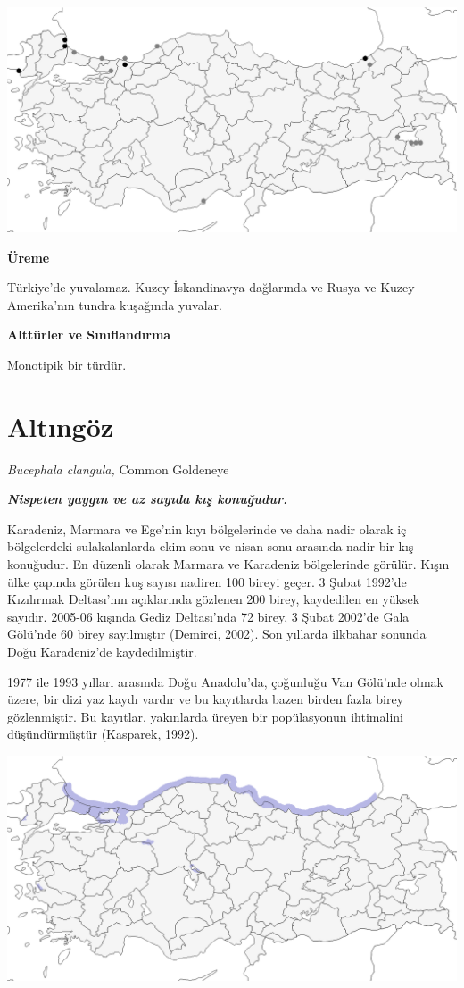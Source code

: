 \documentclass[
  a4paper,
  DIV=11,
  numbers=noendperiod]{scrartcl}
\begin{document}
\includegraphics{images/harita_Clangula hyemalis.png}

\textbf{Üreme}

Türkiye'de yuvalamaz. Kuzey İskandinavya dağlarında ve Rusya ve Kuzey
Amerika'nın tundra kuşağında yuvalar.

\textbf{Alttürler ve Sınıflandırma}

Monotipik bir türdür.

\section{Altıngöz}\label{altux131nguxf6z}

\emph{Bucephala clangula,} Common Goldeneye

\textbf{\emph{Nispeten yaygın ve az sayıda kış konuğudur.}}

Karadeniz, Marmara ve Ege'nin kıyı bölgelerinde ve daha nadir olarak iç
bölgelerdeki sulakalanlarda ekim sonu ve nisan sonu arasında nadir bir
kış konuğudur. En düzenli olarak Marmara ve Karadeniz bölgelerinde
görülür. Kışın ülke çapında görülen kuş sayısı nadiren 100 bireyi geçer.
3 Şubat 1992'de Kızılırmak Deltası'nın açıklarında gözlenen 200 birey,
kaydedilen en yüksek sayıdır. 2005-06 kışında Gediz Deltası'nda 72
birey, 3 Şubat 2002'de Gala Gölü'nde 60 birey sayılmıştır (Demirci,
2002). Son yıllarda ilkbahar sonunda Doğu Karadeniz'de kaydedilmiştir.

1977 ile 1993 yılları arasında Doğu Anadolu'da, çoğunluğu Van Gölü'nde
olmak üzere, bir dizi yaz kaydı vardır ve bu kayıtlarda bazen birden
fazla birey gözlenmiştir. Bu kayıtlar, yakınlarda üreyen bir
popülasyonun ihtimalini düşündürmüştür (Kasparek, 1992).

\includegraphics{images/harita_Bucephala clangula.png}
\end{document}
